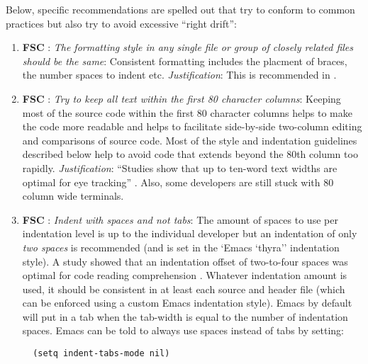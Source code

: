 Below, specific recommendations are spelled out that try to conform to common
practices but also try to avoid excessive ``right drift'':

\begin{enumerate}

{}\item{}\textbf{FSC }:
{}\textit{The formatting style in any single file or group of closely
related files should be the same}: Consistent formatting includes the placment
of braces, the number spaces to indent etc.  {}\textit{Justification}: This is
recommended in {}\cite[Item 0]{C++CodingStandards05}.

{}\item{}\textbf{FSC }:
{}\textit{Try to keep all text within the first 80 character columns}:
Keeping most of the source code within the first 80 character columns helps to
make the code more readable and helps to facilitate side-by-side two-column
editing and comparisons of source code.  Most of the style and indentation
guidelines described below help to avoid code that extends beyond the 80th
column too rapidly. {}\textit{Justification}: ``Studies show that up to
ten-word text widths are optimal for eye tracking'' {}\cite[Item
0]{C++CodingStandards05}.  Also, some developers are still stuck with 80
column wide terminals.

{}\item{}\textbf{FSC }:
{}\textit{Indent with spaces and not tabs}: The amount of spaces to use
per indentation level is up to the individual developer but an indentation of
only {}\textit{two spaces} is recommended (and is set in the `Emacs `thyra''
indentation style).  A study showed that an indentation offset of two-to-four
spaces was optimal for code reading comprehension {}\cite[Section
31.2]{CodeComplete2nd04}.  Whatever indentation amount is used, it should be
consistent in at least each source and header file {}\cite[Item
0]{C++CodingStandards05} (which can be enforced using a custom Emacs
indentation style).  Emacs by default will put in a tab when the tab-width is
equal to the number of indentation spaces.  Emacs can be told to always use
spaces instead of tabs by setting:

{\small\begin{verbatim}
  (setq indent-tabs-mode nil)
\end{verbatim}}


\end{enumerate}
